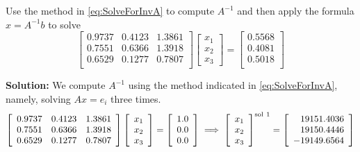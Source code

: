 \begin{example}
Use the method in \eqref{eq:SolveForInvA} to compute $A^{-1}$ and then apply the formula $x=A^{-1} b$  to solve
\begin{equation}
\left[
\begin{array}{ccc}
0.9737 & 0.4123 & 1.3861 \\
0.7551 & 0.6366 & 1.3918 \\
0.6529 & 0.1277 & 0.7807 \\
\end{array}
\right] \left[
\begin{array}{c}
x_1\\x_2\\x_3
\end{array}
\right] = \left[
\begin{array}{c}
0.5568 \\
0.4081 \\
0.5018 \\
\end{array}
\right]
\end{equation}
\end{example}

\noindent \textbf{Solution:} We compute $A^{-1}$ using the method indicated in \eqref{eq:SolveForInvA}, namely, solving $Ax=e_i$ three times.
$$\left[
\begin{array}{ccc}
0.9737 & 0.4123 & 1.3861 \\
0.7551 & 0.6366 & 1.3918 \\
0.6529 & 0.1277 & 0.7807 \\
\end{array}
\right] \left[
\begin{array}{c}
x_1\\x_2\\x_3
\end{array}
\right] = \left[
\begin{array}{c}
1.0\\
0.0 \\
0.0\\
\end{array}
\right] \implies \left[
\begin{array}{c}
x_1\\x_2\\x_3
\end{array}
\right]^{\rm sol~1}= \left[
\begin{array}{r}
19151.4036 \\
19150.4446 \\
-19149.6564 \\
\end{array}
\right]$$

